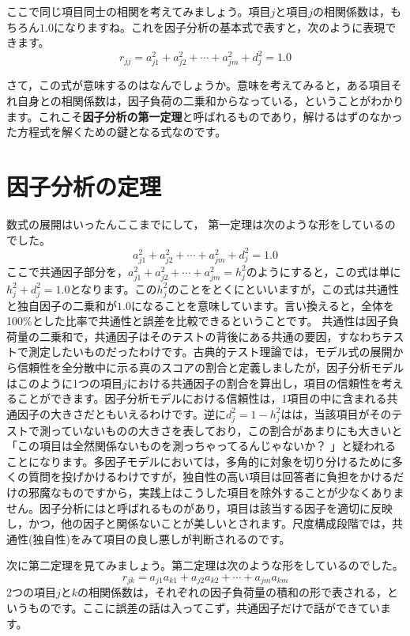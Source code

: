 \documentclass{ltjsbook}
\begin{document}
ここで同じ項目同士の相関を考えてみましょう。項目$j$と項目$j$の相関係数は，もちろん$1.0$になりますね。これを因子分析の基本式で表すと，次のように表現できます。
\begin{equation}
	\label{facteo1}
	r_{jj}=a_{j1}^2+a_{j2}^2+ \cdots + a_{jm}^2 + d_j^2 = 1.0
\end{equation}

さて，この式が意味するのはなんでしょうか。意味を考えてみると，ある項目それ自身との相関係数は，因子負荷の二乗和からなっている，ということがわかります。これこそ\textbf{因子分析の第一定理}と呼ばれるものであり，解けるはずのなかった方程式を解くための鍵となる式なのです。

\section{因子分析の定理}
\label{FactorAnalysisTheorems}
数式の展開はいったんここまでにして，
第一定理は次のような形をしているのでした。
\[a_{j1}^2+a_{j2}^2+ \cdots + a_{jm}^2 + d_j^2 = 1.0 \]
ここで共通因子部分を，$a_{j1}^2+a_{j2}^2+ \cdots + a_{jm}^2=h_j^2$のようにすると，この式は単に$h_j^2 + d_j^2 = 1.0$となります。この$h_j^2$のことをとくにといいますが，この式は共通性と独自因子の二乗和が$1.0$になることを意味しています。言い換えると，全体を100\%とした比率で共通性と誤差を比較できるということです。
共通性は因子負荷量の二乗和で，共通因子はそのテストの背後にある共通の要因，すなわちテストで測定したいものだったわけです。古典的テスト理論では，モデル式の展開から信頼性を全分散中に示る真のスコアの割合と定義しましたが，因子分析モデルはこのように1つの項目$j$における共通因子の割合を算出し，項目の信頼性を考えることができます。因子分析モデルにおける信頼性は，1項目の中に含まれる共通因子の大きさだともいえるわけです。逆に$d_j^2=1-h_j^2$はは，当該項目がそのテストで測っていないものの大きさを表しており，この割合があまりにも大きいと「この項目は全然関係ないものを測っちゃってるんじゃないか？ 」と疑われることになります。多因子モデルにおいては，多角的に対象を切り分けるために多くの質問を投げかけるわけですが，独自性の高い項目は回答者に負担をかけるだけの邪魔なものですから，実践上はこうした項目を除外することが少なくありません。因子分析にはと呼ばれるものがあり，項目は該当する因子を適切に反映し，かつ，他の因子と関係ないことが美しいとされます。尺度構成段階では，共通性(独自性)をみて項目の良し悪しが判断されるのです。

次に第二定理を見てみましょう。第二定理は次のような形をしているのでした。
\[  r_{jk}=a_{j1}a_{k1}+a_{j2}a_{k2}+ \cdots +a_{jm}a_{km} \]
2つの項目$j$と$k$の相関係数は，それぞれの因子負荷量の積和の形で表される，というものです。ここに誤差の話は入ってこず，共通因子だけで話ができています。
\end{document}

